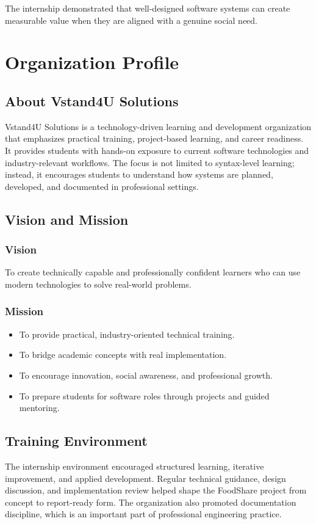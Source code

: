 \documentclass[12pt,a4paper]{report}
\newcommand{\companybrand}{Vstand4U Solutions}
\newcommand{\projecttitle}{FoodShare}
\begin{document}
The internship demonstrated that well-designed software systems can create measurable value when they are aligned with a genuine social need.

\chapter{Organization Profile}

\section{About \companybrand}
\companybrand{} is a technology-driven learning and development organization that emphasizes practical training, project-based learning, and career readiness. It provides students with hands-on exposure to current software technologies and industry-relevant workflows. The focus is not limited to syntax-level learning; instead, it encourages students to understand how systems are planned, developed, and documented in professional settings.

\section{Vision and Mission}
\subsection{Vision}
To create technically capable and professionally confident learners who can use modern technologies to solve real-world problems.

\subsection{Mission}
\begin{itemize}[leftmargin=1.2cm]
\item To provide practical, industry-oriented technical training.
\item To bridge academic concepts with real implementation.
\item To encourage innovation, social awareness, and professional growth.
\item To prepare students for software roles through projects and guided mentoring.
\end{itemize}

\section{Training Environment}
The internship environment encouraged structured learning, iterative improvement, and applied development. Regular technical guidance, design discussion, and implementation review helped shape the \projecttitle{} project from concept to report-ready form. The organization also promoted documentation discipline, which is an important part of professional engineering practice.
\end{document}
